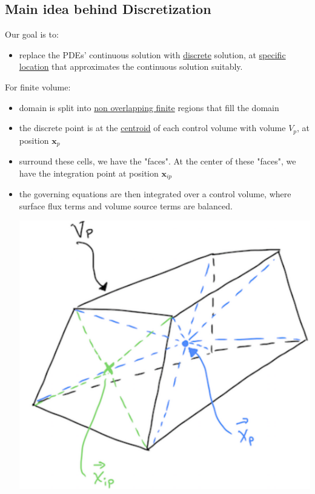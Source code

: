 \documentclass[11pt]{article}
\begin{document}
\subsection{Main idea behind Discretization}
\label{sec:org72d01ae}
Our goal is to:
\begin{itemize}
\item replace the PDEs' continuous solution with \uline{discrete} solution, at \uline{specific location} that approximates the continuous
solution suitably.
\end{itemize}
For finite volume:
\begin{itemize}
\item domain is split into \uline{non overlapping finite} regions that fill the domain
\item the discrete point is at the \uline{centroid} of each control volume with volume \(V_p\), at position \(\textbf{x}_p\)
\item surround these cells, we have the "faces". At the center of these "faces", we have the integration point at position
\(\textbf{x}_{ip}\)
\item the governing equations are then integrated over a control volume, where surface flux terms and volume source terms are
balanced. 
\begin{center}
\includegraphics[scale=0.2]{pic/finiteVolumeElement.png}
\end{center}
\end{itemize}
\end{document}
